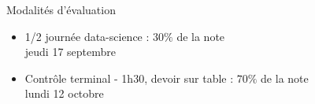 \documentclass[10pt]{beamer}
\makeatletter
\newcommand{\verbatimfont}[1]{\renewcommand{\verbatim@font}{\ttfamily#1}}
\makeatother
\begin{document}
%	
%	

\begin{frame}{Modalités d'évaluation}
	\begin{itemize}
	\item 1/2 journée data-science  : $30\% $ de la note\\[0.5em]
	\textcolor{MPTgrey}{jeudi 17 septembre}\\[2em]
	\item Contrôle terminal - 1h30, devoir sur table : $70\%$ de la note\\[0.5em]
	\textcolor{MPTgrey}{lundi 12 octobre}

	\end{itemize}
	\vspace*{3em}
\end{frame}
\end{document}
